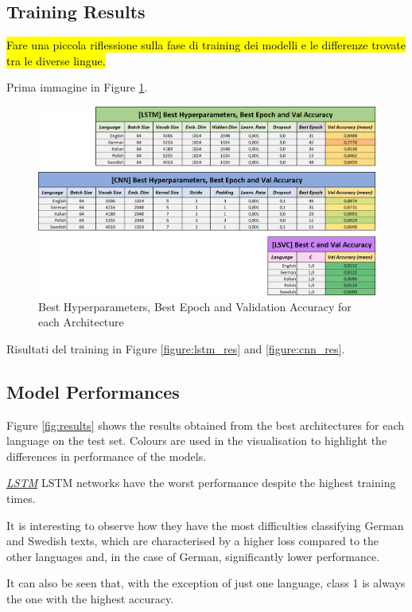 \documentclass[letterpaper,11pt]{article}
\begin{document}
\subsection{Training Results}

\hl{Fare una piccola riflessione sulla fase di training dei modelli e le differenze trovate tra le diverse lingue.}

Prima immagine in Figure \ref{fig:hyperparam_epoch_res}.

\begin{figure}[H]
  \centering
  \includegraphics[width=\textwidth]{hyperparam_res.png}
  \caption{Best Hyperparameters, Best Epoch and Validation Accuracy for each Architecture}
  \label{fig:hyperparam_epoch_res}
\end{figure}

Risultati del training in Figure \ref{figure:lstm_res} and  \ref{figure:cnn_res}.

\subsection{Model Performances}

Figure \ref{fig:results} shows the results obtained from the best architectures for each language on the test set. Colours are used in the visualisation to highlight the differences in performance of the models.  

\underline{\textit{LSTM}} LSTM networks have the worst performance despite the highest training times. 

It is interesting to observe how they have the most difficulties classifying German and Swedish texts, which are characterised by a higher loss compared to the other languages and, in the case of German, significantly lower performance.

It can also be seen that, with the exception of just one language, class 1 is always the one with the highest accuracy.
\end{document}
